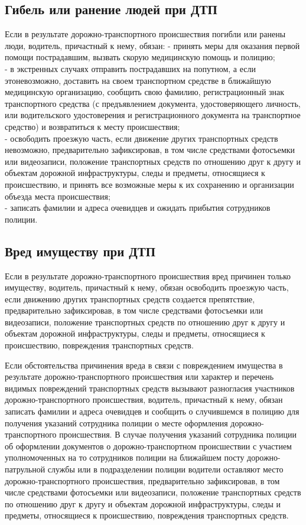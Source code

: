 \documentclass[russian,english,12pt,a4paper,reqno,dviphfm,oneside]{book}
\begin{document}
{\subsection{Гибель или ранение людей при ДТП} Если в результате дорожно-транспортного происшествия погибли или ранены люди, водитель, причастный к нему, обязан:
- принять меры для оказания первой помощи пострадавшим, вызвать скорую медицинскую помощь и полицию;\\
- в экстренных случаях отправить пострадавших на попутном, а если этоневозможно, доставить на своем транспортном средстве в ближайшую медицинскую организацию, сообщить свою фамилию, регистрационный знак транспортного средства (с предъявлением документа, удостоверяющего личность, или водительского удостоверения и регистрационного документа на транспортное средство) и возвратиться к месту происшествия;\\
- освободить проезжую часть, если движение других транспортных средств невозможно, предварительно зафиксировав, в том числе средствами фотосъемки или видеозаписи, положение транспортных средств по отношению друг к другу и объектам дорожной инфраструктуры, следы и предметы, относящиеся к происшествию, и принять все возможные меры к их сохранению и организации объезда места происшествия;\\
- записать фамилии и адреса очевидцев и ожидать прибытия сотрудников полиции.

\subsection{Вред имуществу при ДТП} Если в результате дорожно-транспортного происшествия вред причинен только имуществу, водитель, причастный к нему, обязан освободить проезжую часть, если движению других транспортных средств создается препятствие, предварительно зафиксировав, в том числе средствами фотосъемки или видеозаписи, положение транспортных средств по отношению друг к другу и объектам дорожной инфраструктуры, следы и предметы, относящиеся к происшествию, повреждения транспортных средств.

Если обстоятельства причинения вреда в связи с повреждением имущества в результате дорожно-транспортного происшествия или характер и перечень видимых повреждений транспортных средств вызывают разногласия участников дорожно-транспортного происшествия, водитель, причастный к нему, обязан записать фамилии и адреса очевидцев и сообщить о случившемся в полицию для получения указаний сотрудника полиции о месте оформления дорожно-транспортного происшествия. В случае получения указаний сотрудника полиции об оформлении документов о дорожно-транспортном происшествии с участием уполномоченных на то сотрудников полиции на ближайшем посту дорожно-патрульной службы или в подразделении полиции водители оставляют место дорожно-транспортного происшествия, предварительно зафиксировав, в том числе средствами фотосъемки или видеозаписи, положение транспортных средств по отношению друг к другу и объектам дорожной инфраструктуры, следы и предметы, относящиеся к происшествию, повреждения транспортных средств.

}
\end{document}
